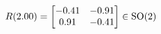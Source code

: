 \documentclass[preview]{standalone}
\begin{document}
\begin{align*}
\special{dvisvgm:raw <g id='unique000'>}R(2.00) = \begin{bmatrix} -0.41 & -0.91 \\ 0.91 & -0.41 \end{bmatrix} \in \text{SO}(2)\special{dvisvgm:raw </g>}
\end{align*}
\end{document}
